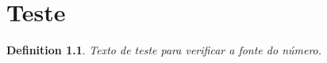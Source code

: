 \documentclass{memoir}
\theoremstyle{sipserstyle}
\newtheorem{definition}{Definition}[chapter]
\begin{document}
\chapter{Teste}

\begin{definition}
Texto de teste para verificar a fonte do número.
\end{definition}
\end{document}
